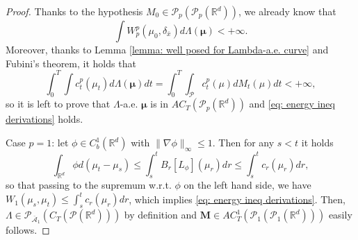 \documentclass[10pt,leqno]{amsart}
\numberwithin{equation}{section}
\newcommand{\R}{\mathbb{R}}
\newcommand{\PP}{\mathcal{P}}
\begin{document}
\begin{proof}
    Thanks to the hypothesis $M_0\in \PP_p(\PP_p(\R^d))$, we already know that 
    \[\int W_p^p(\mu_0,\delta_{\bar{x}}) d\Lambda(\boldsymbol{\mu})<+\infty.\]
    Moreover, thanks to Lemma \ref{lemma: well posed for Lambda-a.e. curve} and Fubini's theorem, it holds that 
    \[\int_0^T\int c_t^p(\mu_t) d\Lambda(\boldsymbol{\mu}) dt = \int_0^T \int_\PP c_t^p(\mu) dM_t(\mu) dt <+\infty,\]
    so it is left to prove that $\Lambda$-a.e. $\boldsymbol{\mu}$ is in $AC_T(\PP_p(\R^d))$ and \eqref{eq: energy ineq derivations} holds.

    Case $p=1$: let $\phi \in C_b^1(\R^d)$ with $\|\nabla \phi\|_\infty \leq 1$. Then for any $s<t$ it holds
    \[\int_{\R^d} \phi d(\mu_t-\mu_s) \leq \int_s^t B_r[L_\phi](\mu_r) dr \leq \int_s^t c_r(\mu_r)dr,\]
    so that passing to the supremum w.r.t. $\phi$ on the left hand side, we have $W_1(\mu_s,\mu_t)\leq \int_s^t c_r(\mu_r)dr$, which implies \eqref{eq: energy ineq derivations}. Then, $\Lambda \in \PP_{\overline{\mathcal{A}}_1}(C_T(\PP(\R^d)))$ by definition and $\boldsymbol{M}\in AC_T^1(\PP_1(\PP_1(\R^d)))$ easily follows.


\end{proof}
\end{document}
